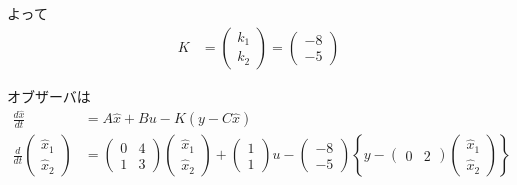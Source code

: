 よって
\begin{align*}
	K&=
	\left (
	\begin{array}{c}
	 k_1 \\ k_2 
	\end{array}
	\right )
	=
	\left (
	\begin{array}{c}
	 -8 \\ -5 
	\end{array}
	\right )
\end{align*}

オブザーバは
\begin{align*}
 \frac{d \hat{x}}{dt} &= A \hat{x} + B u - K (y - C \hat{x})
\\
 \frac{d}{dt}
	\left (
	\begin{array}{c}
	 \hat{x}_1 \\ \hat{x}_2 
	\end{array}
	\right )
	&=
 	\left (
	\begin{array}{cc}
	 0 & 4 \\
	 1 & 3
	\end{array}
	\right )
	\left (
	\begin{array}{c}
	 \hat{x}_1 \\ \hat{x}_2 
	\end{array}
	\right )
	+ 
	\left (
	\begin{array}{c}
	 1 \\ 1 
	\end{array}
	\right )
	u
	-
	\left (
	\begin{array}{c}
	 -8 \\ -5 
	\end{array}
	\right )
	\left \{
		y -
		\left ( \begin{array}{cc}
			0 & 2 
		\end{array} \right )
		\left (
		\begin{array}{c}
		 \hat{x}_1 \\ \hat{x}_2 
		\end{array}
		\right )
	\right \}
\end{align*}






